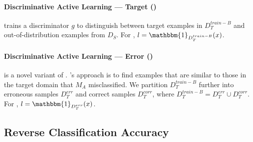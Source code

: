        \paragraph{Discriminative Active Learning --- Target (\dalt)}
        \dalt{} trains a discriminator $g$ to distinguish between target examples in $D_T^{train-B}$ and out-of-distribution examples from $D_{S}$. 
        For \dalt{}, $l=\mathbbm{1}_{D_T^{train-B}}(x)$.
        
        \respace
        \paragraph{Discriminative Active Learning --- Error (\dale)}
        \dale{} is a novel variant of \dal.
        \dale's approach is to find examples that are similar to those in the target domain that $M_A$ misclassified.
        We partition $D_T^{train-B}$ further into erroneous samples $D_T^{err}$ and correct samples $D_T^{corr}$, where $D_T^{train-B} = D_T^{err} \cup D_T^{corr}$. For \dale{}, $l=\mathbbm{1}_{D^{err}_T}(x)$.


    \respace
    \subsection{Reverse Classification Accuracy}
    \label{sec:rca-methods}


